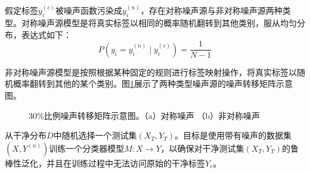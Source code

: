 假定标签$y_i^{(c)}$被噪声函数污染成$y_i^{(n)}$，存在对称噪声源与非对称噪声源两种类型。对称噪声源模型是将真实标签以相同的概率随机翻转到其他类别，服从均匀分布，表达式如下：
\begin{equation}
    P(y_i=y_i^{(n)} \mid y_i^{(c)})=\frac{1}{N-1}
\end{equation}

非对称噪声源模型是按照根据某种固定的规则进行标签映射操作，将真实标签以随机概率翻转到其他的某个类别。图\ref{fig:noisy_type}展示了两种类型噪声源的噪声转移矩阵示意图。
\begin{figure}[ht!]
    \caption{30\%比例噪声转移矩阵示意图。（a）对称噪声 （b）非对称噪声}
    \label{fig:noisy_type}
\end{figure}

从干净分布$D$中随机选择一个测试集$(X_T, Y_T)$。目标是使用带有噪声的数据集$(X, Y^{(n)})$训练一个分类器模型$M:X \rightarrow Y$，以确保对干净测试集$(X_T, Y_T)$的鲁棒性泛化，并且在训练过程中无法访问原始的干净标签$Y_c$。


